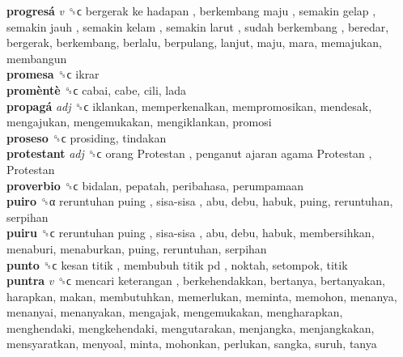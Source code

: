 \textbf{progresá} \emph{v}  ␝ϲ   bergerak ke hadapan ,  berkembang maju ,  semakin gelap ,  semakin jauh ,  semakin kelam ,  semakin larut ,  sudah berkembang , beredar, bergerak, berkembang, berlalu, berpulang, lanjut, maju, mara, memajukan, membangun  \\
\textbf{promesa} ␝ϲ  ikrar  \\
\textbf{promèntè} ␝ϲ  cabai, cabe, cili, lada  \\
\textbf{propagá} \emph{adj}  ␝ϲ  iklankan, memperkenalkan, mempromosikan, mendesak, mengajukan, mengemukakan, mengiklankan, promosi  \\
\textbf{proseso} ␝ϲ  prosiding, tindakan  \\
\textbf{protestant} \emph{adj}  ␝ϲ   orang Protestan ,  penganut ajaran agama Protestan ,  Protestan   \\
\textbf{proverbio} ␝ϲ  bidalan, pepatah, peribahasa, perumpamaan  \\
\textbf{puiro} ␝α   reruntuhan puing ,  sisa-sisa , abu, debu, habuk, puing, reruntuhan, serpihan  \\
\textbf{puiru} ␝ϲ   reruntuhan puing ,  sisa-sisa , abu, debu, habuk, membersihkan, menaburi, menaburkan, puing, reruntuhan, serpihan  \\
\textbf{punto} ␝ϲ   kesan titik ,  membubuh titik pd , noktah, setompok, titik  \\
\textbf{puntra} \emph{v}  ␝ϲ   mencari keterangan , berkehendakkan, bertanya, bertanyakan, harapkan, makan, membutuhkan, memerlukan, meminta, memohon, menanya, menanyai, menanyakan, mengajak, mengemukakan, mengharapkan, menghendaki, mengkehendaki, mengutarakan, menjangka, menjangkakan, mensyaratkan, menyoal, minta, mohonkan, perlukan, sangka, suruh, tanya  \\
